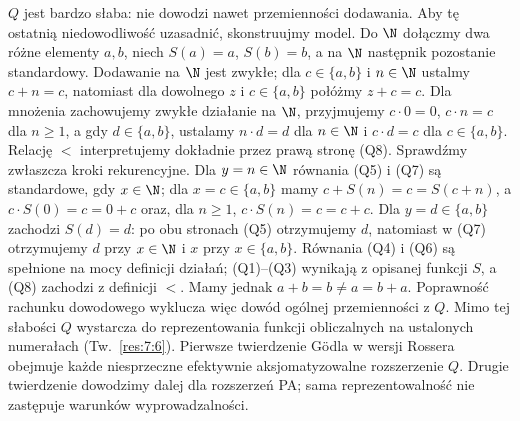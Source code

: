 \begin{uwaga}\label{res:4:11}
$Q$ jest bardzo słaba: nie dowodzi nawet przemienności dodawania. Aby tę ostatnią niedowodliwość uzasadnić, skonstruujmy model. Do $\N$ dołączmy dwa różne elementy $a,b$, niech $S(a)=a$, $S(b)=b$, a na $\N$ następnik pozostanie standardowy. Dodawanie na $\N$ jest zwykłe; dla $c\in\{a,b\}$ i $n\in\N$ ustalmy $c+n=c$, natomiast dla dowolnego $z$ i $c\in\{a,b\}$ połóżmy $z+c=c$. Dla mnożenia zachowujemy zwykłe działanie na $\N$, przyjmujemy $c\cdot0=0$, $c\cdot n=c$ dla $n\ge1$, a gdy $d\in\{a,b\}$, ustalamy $n\cdot d=d$ dla $n\in\N$ i $c\cdot d=c$ dla $c\in\{a,b\}$. Relację $<$ interpretujemy dokładnie przez prawą stronę (Q8). Sprawdźmy zwłaszcza kroki rekurencyjne. Dla $y=n\in\N$ równania (Q5) i (Q7) są standardowe, gdy $x\in\N$; dla $x=c\in\{a,b\}$ mamy $c+S(n)=c=S(c+n)$, a $c\cdot S(0)=c=0+c$ oraz, dla $n\ge1$, $c\cdot S(n)=c=c+c$. Dla $y=d\in\{a,b\}$ zachodzi $S(d)=d$: po obu stronach (Q5) otrzymujemy $d$, natomiast w (Q7) otrzymujemy $d$ przy $x\in\N$ i $x$ przy $x\in\{a,b\}$. Równania (Q4) i (Q6) są spełnione na mocy definicji działań; (Q1)--(Q3) wynikają z opisanej funkcji $S$, a (Q8) zachodzi z definicji $<$. Mamy jednak $a+b=b\ne a=b+a$. Poprawność rachunku dowodowego wyklucza więc dowód ogólnej przemienności z $Q$. Mimo tej słabości $Q$ wystarcza do reprezentowania funkcji obliczalnych na ustalonych numerałach (Tw.~\ref{res:7:6}). Pierwsze twierdzenie Gödla w wersji Rossera obejmuje każde niesprzeczne efektywnie aksjomatyzowalne rozszerzenie $Q$. Drugie twierdzenie dowodzimy dalej dla rozszerzeń PA; sama reprezentowalność nie zastępuje warunków wyprowadzalności.
\end{uwaga}

